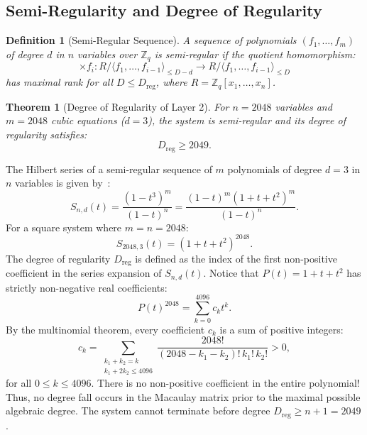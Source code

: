 \documentclass{ieeeaccess}
\newcommand{\Z}{\mathbb{Z}}
\newtheorem{theorem}{Theorem}
\newtheorem{definition}{Definition}
\newenvironment{proof}{\begin{IEEEproof}\IEEEQEDoff}{\end{IEEEproof}}
\begin{document}
\subsection{Semi-Regularity and Degree of Regularity}
\begin{definition}[Semi-Regular Sequence]
A sequence of polynomials $(f_1, \dots, f_m)$ of degree $d$ in $n$ variables over $\Z_q$ is semi-regular if the quotient homomorphism:
\begin{equation}
  \times f_i : R / \langle f_1, \dots, f_{i-1} \rangle_{\leq D - d} \longrightarrow R / \langle f_1, \dots, f_{i-1} \rangle_{\leq D}
\end{equation}
has maximal rank for all $D \leq D_{\mathrm{reg}}$, where $R = \Z_q[x_1, \dots, x_n]$.
\end{definition}

\begin{theorem}[Degree of Regularity of Layer 2]
\label{thm:L2-reg}
For $n = 2048$ variables and $m = 2048$ cubic equations ($d = 3$), the system is semi-regular and its degree of regularity satisfies:
\begin{equation}
  D_{\mathrm{reg}} \geq 2049.
\end{equation}
\end{theorem}
\begin{proof}
The Hilbert series of a semi-regular sequence of $m$ polynomials of degree $d=3$ in $n$ variables is given by~\cite{Bardet2004}:
\begin{equation}
  S_{n,d}(t) = \frac{(1 - t^3)^m}{(1 - t)^n} = \frac{(1 - t)^m (1 + t + t^2)^m}{(1 - t)^n}.
\end{equation}
For a square system where $m = n = 2048$:
\begin{equation}
  S_{2048, 3}(t) = (1 + t + t^2)^{2048}.
\end{equation}
The degree of regularity $D_{\mathrm{reg}}$ is defined as the index of the first non-positive coefficient in the series expansion of $S_{n,d}(t)$.
Notice that $P(t) = 1 + t + t^2$ has strictly non-negative real coefficients:
\begin{equation}
  P(t)^{2048} = \sum_{k=0}^{4096} c_k t^k.
\end{equation}
By the multinomial theorem, every coefficient $c_k$ is a sum of positive integers:
\begin{equation}
  c_k = \sum_{\substack{k_1 + k_2 = k \\ k_1 + 2k_2 \leq 4096}} \frac{2048!}{(2048 - k_1 - k_2)!\, k_1!\, k_2!} > 0,
\end{equation}
for all $0 \leq k \leq 4096$. There is no non-positive coefficient in the entire polynomial!
Thus, no degree fall occurs in the Macaulay matrix prior to the maximal possible algebraic degree. The system cannot terminate before degree $D_{\mathrm{reg}} \geq n + 1 = 2049$.
\end{proof}
\end{document}
